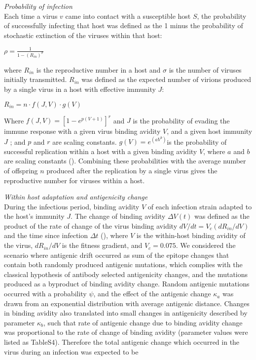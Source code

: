 \documentclass[12pt,a4paper]{article}
\begin{document}
\textit{Probability of infection} \\
Each time a virus $v$ came into contact with a susceptible host $S$, the probability of successfully infecting that host was defined as the 1 minus the probability of stochastic extinction of the viruses within that host:

$\rho = \frac{1}{1-(R_{in})^\sigma}$

where $R_{in}$ is the reproductive number in a host and $\sigma$ is the number of viruses initially transmitted. $R_{in}$ was defined as the expected number of virions produced by a single virus in a host with effective immunity $J$:

$R_{in}=n \cdot f(J,V) \cdot g(V)$

Where $f(J,V) = [1 - e^{p(V+1)}]^r$ and $J$ is the probability of evading the immune response with a given virus binding avidity $V$, and a given host immunity $J$ ;  and $p$ and $r$ are scaling constants. $g(V) = e^{(aV^b)}$is the probability of successful replication within a host with a given binding avidity $V$, where $a$ and $b$ are scaling constants (\cite{Yuan2013}). Combining these probabilities with the average number of offspring $n$ produced after the replication by a single virus gives the reproductive number for viruses within a host.

\textit{Within host adaptation and antigenicity change} \\
During the infectious period, binding avidity $V$ of each infection strain adapted to the host’s immunity $J$. The change of binding avidity $\Delta V(t)$ was defined as the product of the rate of change of the virus binding avidity $dV/dt =V_{c}(dR_{in}/dV)$ and the time since infection $\Delta t$ (\cite{Yuan2013}), where $V$ is the within-host binding avidity of the virus, $dR_{in}/dV$ is the fitness gradient, and $V_{c}=0.075$. We considered the scenario where antigenic drift occurred as sum of the epitope changes that contain both randomly produced antigenic mutations, which complies with the classical hypothesis of antibody selected antigenicity changes, and the mutations produced as a byproduct of binding avidity change. Random antigenic mutations occurred with a probability $\psi$, and the effect of the antigenic change $\kappa_{a}$ was drawn from an exponential distribution with average antigenic distance. Changes in binding avidity also translated into small changes in antigenicity described by parameter $\kappa_{b}$, such that rate of antigenic change due to binding avidity change was proportional to the rate of change of binding avidity (parameter values were listed as TableS4). Therefore the total antigenic change which occurred in the virus during an infection was expected to be
\end{document}
